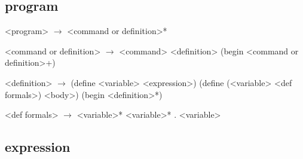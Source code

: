 \documentclass[10pt]{article}
\begin{document}
\subsection*{program}

\begin{grammar}
  <program> $\longrightarrow$ <command or definition>*

  <command or definition> $\longrightarrow$ <command>
  \alt <definition>
  \alt (begin <command or definition>+)

  <definition> $\longrightarrow$ (define <variable> <expression>)
  \alt (define (<variable> <def formals>) <body>)
  \alt (begin <definition>*)

  <def formals> $\longrightarrow$ <variable>*
  \alt <variable>*  .  <variable>
\end{grammar}

\subsection*{expression}
\end{document}
